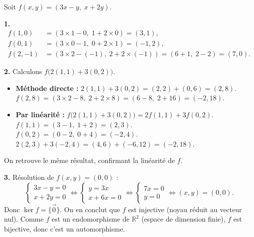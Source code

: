 \documentclass[11pt]{article}
\newcommand{\cle}[1]{{\popxbold\color{popdark}#1}}
\begin{document}
\begin{corrige}
Soit $f(x,y)=(3x-y,\;x+2y)$.

\textbf{1.}
\begin{align*}
f(1,0) &= (3\times1-0,\;1+2\times0) = (3,1), \\
f(0,1) &= (3\times0-1,\;0+2\times1) = (-1,2), \\
f(2,-1) &= (3\times2-(-1),\;2+2\times(-1)) = (6+1,\;2-2) = (7,0).
\end{align*}

\textbf{2.} Calculons $f\big(2(1,1)+3(0,2)\big)$.
\begin{itemize}
    \item \textbf{Méthode directe :} $2(1,1)+3(0,2) = (2,2)+(0,6) = (2,8)$.
    $f(2,8) = (3\times2-8,\;2+2\times8) = (6-8,\;2+16) = (-2,18)$.
    \item \textbf{Par linéarité :} $f\big(2(1,1)+3(0,2)\big) = 2f(1,1) + 3f(0,2)$.
    $f(1,1) = (3-1,\;1+2) = (2,3)$.
    $f(0,2) = (0-2,\;0+4) = (-2,4)$.
    $2(2,3) + 3(-2,4) = (4,6) + (-6,12) = (-2,18)$.
\end{itemize}
On retrouve le même résultat, confirmant la linéarité de $f$.

\textbf{3.} Résolution de $f(x,y)=(0,0)$ :
\[ \begin{cases} 3x - y = 0 \\ x + 2y = 0 \end{cases} \iff \begin{cases} y = 3x \\ x + 6x = 0 \end{cases} \iff \begin{cases} 7x = 0 \\ y = 0 \end{cases} \iff (x,y)=(0,0). \]
Donc $\ker f = \{\vec{0}\}$. On en conclut que $f$ est \cle{injective} (noyau réduit au vecteur nul). Comme $f$ est un endomorphisme de $\mathbb{R}^2$ (espace de dimension finie), $f$ est bijective, donc c'est un \cle{automorphisme}.
\end{corrige}
\end{document}
